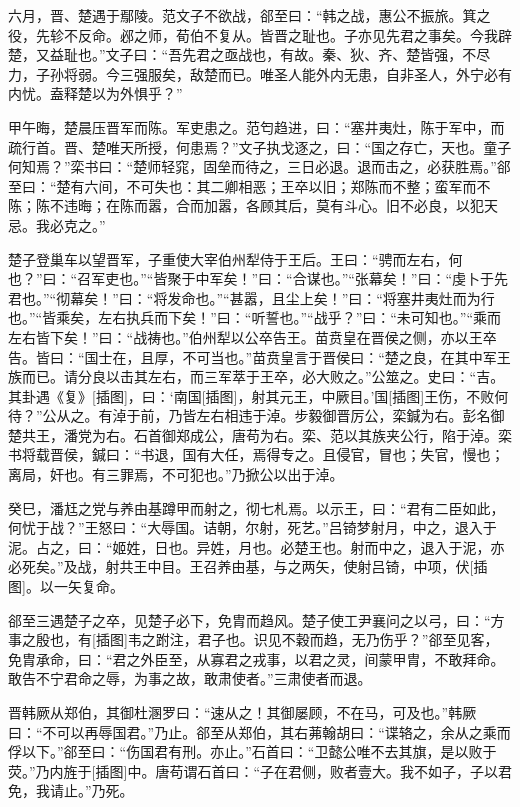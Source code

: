 \documentclass[a4paper,12pt,UTF8,twoside]{ctexbook}
\begin{document}
六月，晋、楚遇于鄢陵。范文子不欲战，郤至曰：“韩之战，惠公不振旅。箕之役，先轸不反命。邲之师，荀伯不复从。皆晋之耻也。子亦见先君之事矣。今我辟楚，又益耻也。”文子曰：“吾先君之亟战也，有故。秦、狄、齐、楚皆强，不尽力，子孙将弱。今三强服矣，敌楚而已。唯圣人能外内无患，自非圣人，外宁必有内忧。盍释楚以为外惧乎？”

甲午晦，楚晨压晋军而陈。军吏患之。范匄趋进，曰：“塞井夷灶，陈于军中，而疏行首。晋、楚唯天所授，何患焉？”文子执戈逐之，曰：“国之存亡，天也。童子何知焉？”栾书曰：“楚师轻窕，固垒而待之，三日必退。退而击之，必获胜焉。”郤至曰：“楚有六间，不可失也：其二卿相恶；王卒以旧；郑陈而不整；蛮军而不陈；陈不违晦；在陈而嚣，合而加嚣，各顾其后，莫有斗心。旧不必良，以犯天忌。我必克之。”

楚子登巢车以望晋军，子重使大宰伯州犁侍于王后。王曰：“骋而左右，何也？”曰：“召军吏也。”“皆聚于中军矣！”曰：“合谋也。”“张幕矣！”曰：“虔卜于先君也。”“彻幕矣！”曰：“将发命也。”“甚嚣，且尘上矣！”曰：“将塞井夷灶而为行也。”“皆乘矣，左右执兵而下矣！”曰：“听誓也。”“战乎？”曰：“未可知也。”“乘而左右皆下矣！”曰：“战祷也。”伯州犁以公卒告王。苗贲皇在晋侯之侧，亦以王卒告。皆曰：“国士在，且厚，不可当也。”苗贲皇言于晋侯曰：“楚之良，在其中军王族而已。请分良以击其左右，而三军萃于王卒，必大败之。”公筮之。史曰：“吉。其卦遇《复》[插图]，曰：‘南国[插图]，射其元王，中厥目。’国[插图]王伤，不败何待？”公从之。有淖于前，乃皆左右相违于淖。步毅御晋厉公，栾鍼为右。彭名御楚共王，潘党为右。石首御郑成公，唐苟为右。栾、范以其族夹公行，陷于淖。栾书将载晋侯，鍼曰：“书退，国有大任，焉得专之。且侵官，冒也；失官，慢也；离局，奸也。有三罪焉，不可犯也。”乃掀公以出于淖。

癸巳，潘尪之党与养由基蹲甲而射之，彻七札焉。以示王，曰：“君有二臣如此，何忧于战？”王怒曰：“大辱国。诘朝，尔射，死艺。”吕锜梦射月，中之，退入于泥。占之，曰：“姬姓，日也。异姓，月也。必楚王也。射而中之，退入于泥，亦必死矣。”及战，射共王中目。王召养由基，与之两矢，使射吕锜，中项，伏[插图]。以一矢复命。

郤至三遇楚子之卒，见楚子必下，免胄而趋风。楚子使工尹襄问之以弓，曰：“方事之殷也，有[插图]韦之跗注，君子也。识见不穀而趋，无乃伤乎？”郤至见客，免胄承命，曰：“君之外臣至，从寡君之戎事，以君之灵，间蒙甲胄，不敢拜命。敢告不宁君命之辱，为事之故，敢肃使者。”三肃使者而退。

晋韩厥从郑伯，其御杜溷罗曰：“速从之！其御屡顾，不在马，可及也。”韩厥曰：“不可以再辱国君。”乃止。郤至从郑伯，其右茀翰胡曰：“谍辂之，余从之乘而俘以下。”郤至曰：“伤国君有刑。亦止。”石首曰：“卫懿公唯不去其旗，是以败于荧。”乃内旌于[插图]中。唐苟谓石首曰：“子在君侧，败者壹大。我不如子，子以君免，我请止。”乃死。
\end{document}
